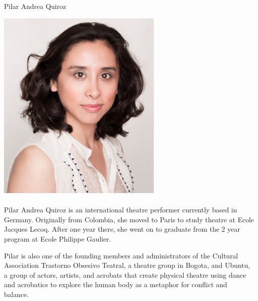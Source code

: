 \documentclass[10pt,a4paper]{scrartcl}
\newcommand\sometitle[1]{{\Huge #1}}
\begin{document}
{ \sometitle{Pilar Andrea Quiroz}}
\\
\onehalfspacing
\normalsize

\includegraphics[width=0.6\textwidth]{pili_big3.jpg}
\\
\\




Pilar Andrea Quiroz is an international theatre performer currently based in
Germany. Originally from Colombia, she moved to Paris to study theatre at Ecole
Jacques Lecoq. After one year there, she went on to graduate from the 2 year
program at Ecole Philippe Gaulier.

Pilar is also one of the founding members and administrators of the Cultural
Association Trastorno Obsesivo Teatral, a theatre group in Bogota, and Ubuntu,
a group of actors, artists, and acrobats that create physical theatre using
dance and acrobatics to explore the human body as a metaphor for conflict and
balance.
\end{document}

